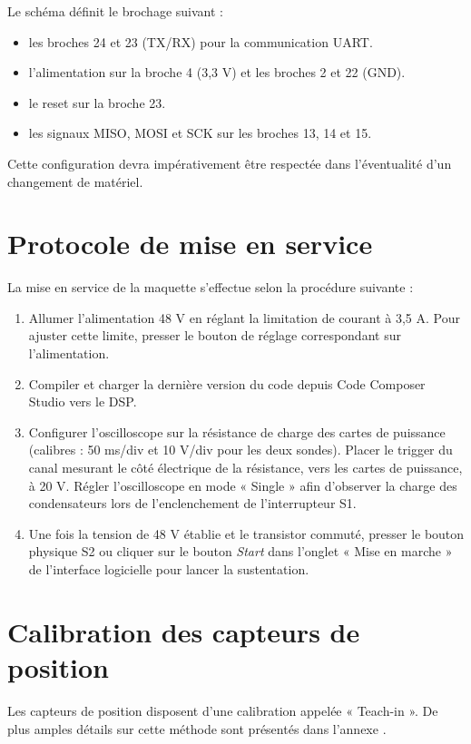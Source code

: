 Le schéma définit le brochage suivant :
\begin{itemize}
    \item les broches 24 et 23 (TX/RX) pour la communication UART.
    \item l’alimentation sur la broche 4 (3,3 V) et les broches 2 et 22 (GND).
    \item le reset sur la broche 23.
    \item les signaux MISO, MOSI et SCK sur les broches 13, 14 et 15.
\end{itemize}

Cette configuration devra impérativement être respectée dans l’éventualité d’un changement de matériel.

\section{Protocole de mise en service}
\label{sec:Protocole}
La mise en service de la maquette s’effectue selon la procédure suivante :
\begin{enumerate}
    \item Allumer l’alimentation 48 V en réglant la limitation de courant à 3,5 A. Pour ajuster cette limite, presser le bouton de réglage correspondant sur l’alimentation.

    \item Compiler et charger la dernière version du code depuis Code Composer Studio vers le DSP.

    \item Configurer l’oscilloscope sur la résistance de charge des cartes de puissance (calibres : 50 ms/div et 10 V/div pour les deux sondes). Placer le trigger du canal mesurant le côté électrique de la résistance, vers les cartes de puissance, à 20 V. Régler l’oscilloscope en mode « Single » afin d’observer la charge des condensateurs lors de l’enclenchement de l’interrupteur S1.

    \item Une fois la tension de 48 V établie et le transistor commuté, presser le bouton physique S2 ou cliquer sur le bouton \textit{Start} dans l’onglet « Mise en marche » de l’interface logicielle pour lancer la sustentation.
\end{enumerate}

\section{Calibration des capteurs de position}
\label{sec:CalibrationCaptPos}
Les capteurs de position disposent d’une calibration appelée « Teach-in ». De plus amples détails sur cette méthode sont présentés dans l’annexe \cite{CaptPosition}.

